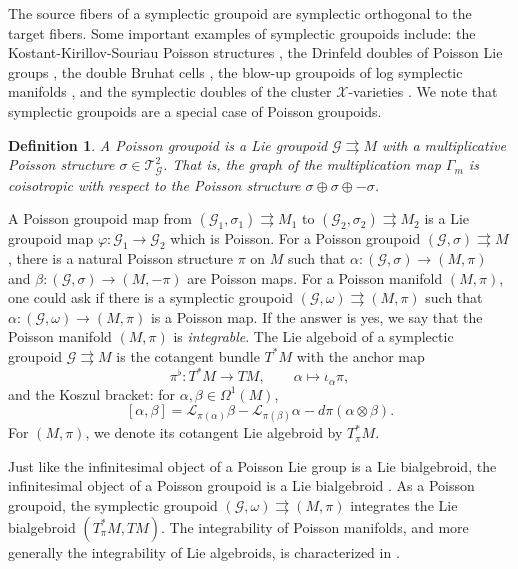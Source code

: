\documentclass{amsart}
\newtheorem{definition}[theorem]{Definition}
\numberwithin{equation}{section}
\newcommand{\cG}{\mathcal{G}}
\newcommand{\cL}{\mathcal{L}}
\newcommand{\cT}{\mathcal{T}}
\newcommand{\cX}{\mathcal{X}}
\newcommand{\rra}{\rightrightarrows}
\begin{document}
The source fibers of a symplectic groupoid are symplectic orthogonal to the target fibers.
Some important examples of symplectic groupoids include: the Kostant-Kirillov-Souriau Poisson structures \cite{MR996653}, the Drinfeld doubles of Poisson Lie groups \cite{MR1054741}, the double Bruhat cells \cite{LuM16}, the blow-up groupoids of log symplectic manifolds \cite{MR3214314}, and the symplectic doubles of the cluster $\cX$-varieties \cite{FG09c}.
We note that symplectic groupoids are a special case of Poisson groupoids.
\begin{definition}
  A \emph{Poisson groupoid} is a Lie groupoid $\cG \rra M$ with a multiplicative Poisson structure $\sigma \in \cT^2_\cG$.
  That is, the graph of the multiplication map $\Gamma_m$ is coisotropic with respect to the Poisson structure $\sigma \oplus \sigma \oplus -\sigma$.
\end{definition}

A Poisson groupoid map from $(\cG_1, \sigma_1) \rra M_1$ to $(\cG_2, \sigma_2) \rra M_2$ is a Lie groupoid map $\varphi: \cG_1 \to \cG_2$ which is Poisson.
For a Poisson groupoid $(\cG, \sigma) \rra M$, there is a natural Poisson structure $\pi$ on $M$ such that $\alpha: (\cG, \sigma) \to (M, \pi)$ and $\beta: (\cG, \sigma) \to (M, -\pi)$ are Poisson maps.
For a Poisson manifold $(M, \pi)$, one could ask if there is a symplectic groupoid $(\cG, \omega) \rra (M, \pi)$ such that $\alpha: (\cG, \omega) \to (M, \pi)$ is a Poisson map.
If the answer is yes, we say that the Poisson manifold $(M, \pi)$ is \emph{integrable}.
The Lie algeboid of a symplectic groupoid $\cG \rra M$ is the cotangent bundle $T^*M$ \cite{MR866024} with the anchor map
\[\pi^\flat: T^*M \to TM, \qquad \alpha \mapsto \iota_\alpha \pi,\]
and the Koszul bracket: for $\alpha, \beta \in \Omega^1(M)$,
\[[\alpha, \beta] = \cL_{\pi(\alpha)} \beta - \cL_{\pi(\beta)} \alpha - d\pi(\alpha \otimes \beta).\]
For $(M, \pi)$, we denote its cotangent Lie algebroid by $T^*_\pi M$.

Just like the infinitesimal object of a Poisson Lie group is a Lie bialgebroid, the infinitesimal object of a Poisson groupoid is a Lie bialgebroid \cite{MR1262213}.
As a Poisson groupoid, the symplectic groupoid $(\cG, \omega) \rra (M, \pi)$ integrates the Lie bialgebroid $(T^*_\pi M, TM)$.
The integrability of Poisson manifolds, and more generally the integrability of Lie algebroids, is characterized in \cite{MR1973056, MR2128714}.
\end{document}
